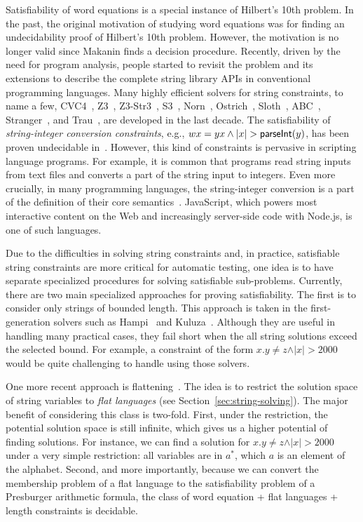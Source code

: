Satisfiability of word equations is a special instance of Hilbert’s 10th problem. 
In the past, the original motivation of studying word equations was for finding an undecidability proof of Hilbert’s 10th problem. 
However, the motivation is no longer valid since Makanin finds a decision procedure. Recently, driven by the need for program analysis, people started to revisit the problem and its extensions to describe the complete string library APIs in conventional programming languages. Many highly efficient solvers for string constraints, to name a few, CVC4~\cite{cvc4Tool}, Z3~\cite{z3}, Z3-Str3~\cite{zheng2013z3}, S3~\cite{trinh2014s3}, Norn~\cite{abdulla2015norn}, Ostrich~\cite{chen2017decidable}, Sloth~\cite{sloth}, ABC~\cite{aydin2018parameterized}, Stranger~\cite{yu2010stranger}, and Trau~\cite{abdulla2018trau}, are developed in the last decade.
The satisfiability of \emph{string-integer conversion constraints}, e.g., $wx=yx \wedge \vert x\vert  > \textsf{parseInt}(y)$, has been proven undecidable in~\cite{DayGHMN18}. 
However, this kind of constraints is pervasive in scripting language programs. 
For example, it is common that programs read string inputs from text files and converts a part of the string input to integers.
Even more crucially, in many programming languages, the string-integer conversion is a part of the definition of their core semantics~\cite{ecmascript2019ecmascript}. 
JavaScript, which powers most interactive content on the Web and increasingly server-side code with Node.js, is one of such languages. 

Due to the difficulties in solving string constraints and, in practice, satisfiable string constraints are more critical for automatic testing, one idea is to have separate specialized procedures for solving satisfiable sub-problems. 
Currently, there are two main specialized approaches for proving satisfiability.
The first is to consider only strings of bounded length.
This approach is taken in the first-generation solvers such as Hampi~\cite{KiezunGAGHE12} and Kuluza~\cite{SaxenaAHMMS10}.
Although they are useful in handling many practical cases, they fail short when the all string solutions exceed the selected bound.
For example, a constraint of the form $x.y \neq z  \wedge \vert x\vert  > 2000$ would be quite challenging to handle using those solvers.

One more recent approach is flattening~\cite{Parosh:20:PLDI,AbdullaACDHRR18,AbdullaACDHRR17}.
The idea is to restrict the solution space of string variables to 
\emph{flat languages} (see Section~\ref{sec:string-solving}). 
The major benefit of considering this class is two-fold.
First, under the restriction, the potential solution space is still infinite, which gives us a higher potential of finding solutions.
For instance, we can find a solution for $x.y \neq z  \wedge \vert x\vert  > 2000$ under a very simple restriction: all variables are in $a^*$, which $a$ is an element of the alphabet.
Second, and more importantly, because we can convert the membership problem of a flat language to the satisfiability problem of a Presburger arithmetic formula, the class of word equation + flat languages + length constraints is decidable.


